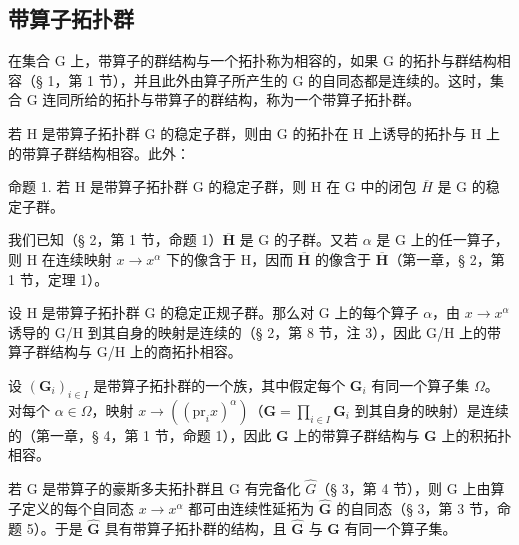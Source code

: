 \subsection{带算子拓扑群}

在集合 G 上，带算子的群结构与一个拓扑称为相容的，如果 G 的拓扑与群结构相容（§ 1，第 1 节），并且此外由算子所产生的 G 的自同态都是连续的。这时，集合 G 连同所给的拓扑与带算子的群结构，称为一个带算子拓扑群。

若 H 是带算子拓扑群 G 的稳定子群，则由 G 的拓扑在 H 上诱导的拓扑与 H 上的带算子群结构相容。此外：

命题 1. 若 H 是带算子拓扑群 G 的稳定子群，则 H 在 G 中的闭包 \(\overline{H}\) 是 G 的稳定子群。

我们已知（§ 2，第 1 节，命题 1）\(\overline{\mathbf{H}}\) 是 G 的子群。又若 \(\alpha\) 是 G 上的任一算子，则 H 在连续映射 \(x \to x^{\alpha}\) 下的像含于 H，因而 \(\overline{\mathbf{H}}\) 的像含于 \(\overline{\mathbf{H}}\)（第一章，§ 2，第 1 节，定理 1）。

设 H 是带算子拓扑群 G 的稳定正规子群。那么对 G 上的每个算子 \(\alpha\)，由 \(x \rightarrow x^{\alpha}\) 诱导的 G/H 到其自身的映射是连续的（§ 2，第 8 节，注 3），因此 G/H 上的带算子群结构与 G/H 上的商拓扑相容。

设 \((\mathbf{G}_i)_{i\in I}\) 是带算子拓扑群的一个族，其中假定每个 \(\mathbf{G}_i\) 有同一个算子集 \(\Omega\)。对每个 \(\alpha \in \Omega\)，映射 \(x\to ((\mathrm{pr}_i x)^{\alpha})\)（\(\mathbf{G} = \prod_{i\in I}\mathbf{G}_i\) 到其自身的映射）是连续的（第一章，§ 4，第 1 节，命题 1），因此 \(\mathbf{G}\) 上的带算子群结构与 \(\mathbf{G}\) 上的积拓扑相容。

若 G 是带算子的豪斯多夫拓扑群且 G 有完备化 \(\hat{G}\)（§ 3，第 4 节），则 G 上由算子定义的每个自同态 \(x \to x^{\alpha}\) 都可由连续性延拓为 \(\hat{\mathbf{G}}\) 的自同态（§ 3，第 3 节，命题 5）。于是 \(\hat{\mathbf{G}}\) 具有带算子拓扑群的结构，且 \(\hat{\mathbf{G}}\) 与 \(\mathbf{G}\) 有同一个算子集。

